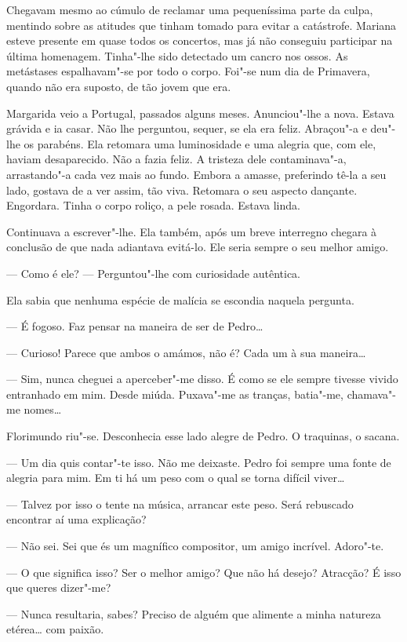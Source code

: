 Chegavam mesmo ao cúmulo de reclamar uma pequeníssima parte da culpa,
mentindo sobre as atitudes que tinham tomado para evitar a catástrofe.
Mariana esteve presente em quase todos os concertos, mas já não
conseguiu participar na última homenagem. Tinha"-lhe sido detectado um
cancro nos ossos. As metástases espalhavam"-se por todo o corpo. Foi"-se
num dia de Primavera, quando não era suposto, de tão jovem que era.

Margarida veio a Portugal, passados alguns meses. Anunciou"-lhe a nova.
Estava grávida e ia casar. Não lhe perguntou, sequer, se ela era feliz.
Abraçou"-a e deu"-lhe os parabéns. Ela retomara uma luminosidade e uma
alegria que, com ele, haviam desaparecido. Não a fazia feliz. A tristeza
dele contaminava"-a, arrastando"-a cada vez mais ao fundo. Embora a
amasse, preferindo tê-la a seu lado, gostava de a ver assim, tão viva.
Retomara o seu aspecto dançante. Engordara. Tinha o corpo roliço, a pele
rosada. Estava linda.

Continuava a escrever"-lhe. Ela também, após um breve interregno chegara
à conclusão de que nada adiantava evitá-lo. Ele seria sempre o seu
melhor amigo.

--- Como é ele? --- Perguntou"-lhe com curiosidade autêntica.

Ela sabia que nenhuma espécie de malícia se escondia naquela pergunta.

--- É fogoso. Faz pensar na maneira de ser de Pedro\ldots{}

--- Curioso! Parece que ambos o amámos, não é? Cada um à sua maneira\ldots{}

--- Sim, nunca cheguei a aperceber"-me disso. É como se ele sempre tivesse
vivido entranhado em mim. Desde miúda. Puxava"-me as tranças, batia"-me,
chamava"-me nomes\ldots{}

Florimundo riu"-se. Desconhecia esse lado alegre de Pedro. O traquinas, o
sacana.

--- Um dia quis contar"-te isso. Não me deixaste. Pedro foi sempre uma
fonte de alegria para mim. Em ti há um peso com o qual se torna difícil
viver\ldots{}

--- Talvez por isso o tente na música, arrancar este peso. Será rebuscado
encontrar aí uma explicação?

--- Não sei. Sei que és um magnífico compositor, um amigo incrível.
Adoro"-te.

--- O que significa isso? Ser o melhor amigo? Que não há desejo? Atracção?
É isso que queres dizer"-me?

--- Nunca resultaria, sabes? Preciso de alguém que alimente a minha
natureza etérea\ldots{} com paixão.

